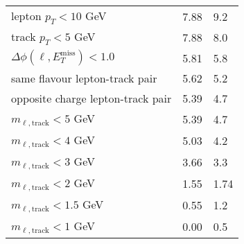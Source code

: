 \documentclass[12pt,fleqn]{article}
\begin{document}
\begin{enumerate}
\begin{table}[h!]
\begin{center}
\begin{tabular}{l|p{3cm}|p{3cm}}
  lepton $p_T < 10$ GeV                                                           &   7.88    &     9.2 \\
  track $p_T < 5$ GeV                                                             &   7.88    &     8.0     \\
  $\Delta\phi(\ell,  E_T^\mathrm{miss} ) < 1.0$                                   &   5.81    &     5.8 \\
  same flavour lepton-track pair                                                  &   5.62    &     5.2\\
  opposite charge lepton-track pair                                               &   5.39    &     4.7  \\
  $m_{\ell,\mathrm{track}} < 5$ GeV                                               &   5.39    &     4.7  \\
  $m_{\ell,\mathrm{track}} < 4$ GeV                                               &   5.03    &     4.2  \\
  $m_{\ell,\mathrm{track}} < 3$ GeV                                               &   3.66    &     3.3  \\
  $m_{\ell,\mathrm{track}} < 2$ GeV                                               &   1.55    &     1.74  \\
  $m_{\ell,\mathrm{track}} < 1.5$ GeV                                             &   0.55    &     1.2  \\
  $m_{\ell,\mathrm{track}} < 1$ GeV                                               &   0.00    &     0.5  \\
  \bottomrule
 \end{tabular} \end{center}
\end{table} 
 
 
\end{enumerate}
 
\end{document}
